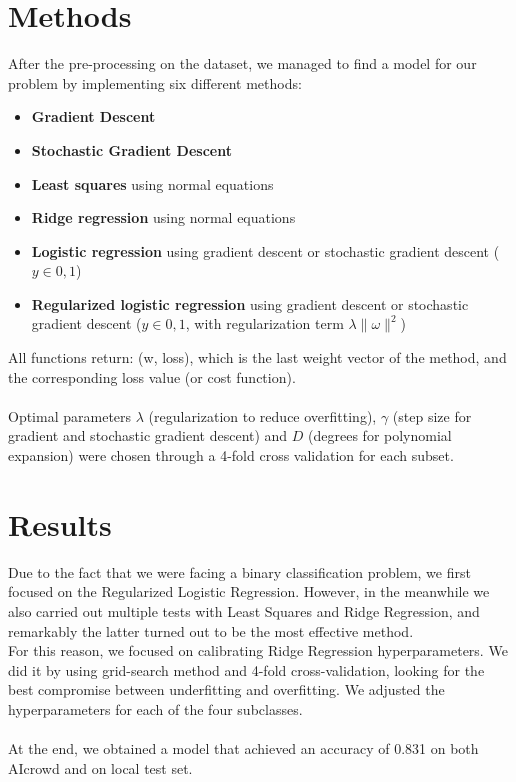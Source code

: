 \documentclass[10pt,conference,compsocconf]{IEEEtran}
\begin{document}
\section{Methods}
After the pre-processing on the dataset, we managed to find a model for our problem by implementing six different methods:
\begin{itemize}
    \item \textbf{Gradient Descent}
    \item \textbf{Stochastic Gradient Descent}
    \item \textbf{Least squares} using normal equations
    \item \textbf{Ridge regression} using normal equations
    \item \textbf{Logistic regression} using gradient descent or stochastic gradient descent ($y \in {0,1}$)
    \item \textbf{Regularized logistic regression} using gradient descent or stochastic gradient descent ($y \in {0,1}$, with regularization term $ \lambda  \| \omega \|^2$)
\end{itemize}
All functions return: (w, loss), which is the last weight vector of the
method, and the corresponding loss value (or cost function).\\
\vspace{0.05cm}\\
Optimal parameters $\lambda$ (regularization to reduce overfitting), $\gamma$ (step size for gradient and stochastic gradient descent) and $D$ (degrees for polynomial expansion) were chosen through a 4-fold cross validation for each subset.



\section{Results}
Due to the fact that we were facing a binary classification problem, we first focused on the Regularized Logistic Regression. However, in the meanwhile we also carried out multiple tests with Least Squares and Ridge Regression, and remarkably the latter turned out to be the most effective method.\\
For this reason, we focused on calibrating Ridge Regression hyperparameters. We did it by using grid-search method and 4-fold cross-validation, looking for the best compromise between underfitting and overfitting. We adjusted the hyperparameters for
each of the four subclasses.\\
\vspace{0.05cm}\\
At the end, we obtained a model that achieved an accuracy of 0.831 on both AIcrowd and on local test set.
\end{document}
